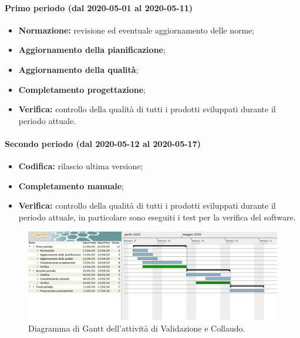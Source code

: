 				\paragraph{Primo periodo (dal 2020-05-01 al 2020-05-11)}
			
					\begin{itemize}
						\item \textbf{Normazione:} revisione ed eventuale aggiornamento delle norme;
						\item \textbf{Aggiornamento della pianificazione};
						\item \textbf{Aggiornamento della qualità};
						\item \textbf{Completamento progettazione};
						\item \textbf{Verifica:} controllo della qualità di tutti i prodotti sviluppati durante il periodo attuale.
					\end{itemize} 	
				
				\paragraph{Secondo periodo (dal 2020-05-12 al 2020-05-17)}
				
					\begin{itemize}
						\item \textbf{Codifica:} rilascio ultima versione;
						\item \textbf{Completamento manuale};
						\item \textbf{Verifica:} controllo della qualità di tutti i prodotti sviluppati durante il periodo attuale, in particolare sono eseguiti i test per la verifica del software.
					\end{itemize}

			
		\begin{landscape}

          \begin{figure}[H]
            \centering
            \includegraphics[width=\linewidth]{images/ganttValidazioneColl}
            \caption{Diagramma di Gantt dell'attività di Validazione e Collaudo.}
          \end{figure}

		\end{landscape}
